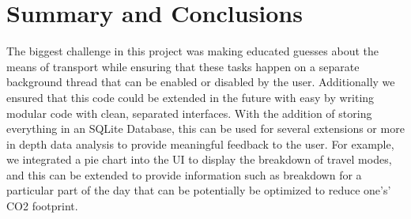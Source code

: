 \documentclass[10pt,conference,compsocconf]{IEEEtran}
\begin{document}
\section{Summary and Conclusions}

The biggest challenge in this project was making educated guesses about the means of transport while ensuring that these tasks happen on a separate background thread that can be enabled or disabled by the user. Additionally we ensured that this code could be extended in the future with easy by writing modular code with clean, separated interfaces. With the addition of storing everything in an SQLite Database, this can be used for several extensions or more in depth data analysis to provide meaningful feedback to the user. For example, we integrated a pie chart into the UI to display the breakdown of travel modes, and this can be extended to provide information such as breakdown for a particular part of the day that can be potentially be optimized to reduce one's’ CO2 footprint.





\clearpage
\end{document}
